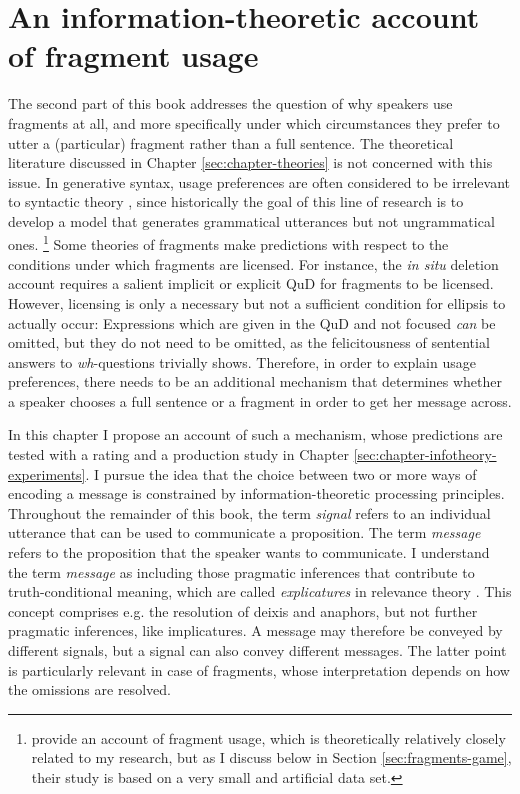 \chapter{An information-theoretic account of fragment usage}
\label{sec:chapter-infotheory}

The second part of this book addresses the question of why speakers use fragments at all, and more specifically under which circumstances they prefer to utter a (particular) fragment rather than a full sentence. The theoretical literature discussed in Chapter \ref{sec:chapter-theories} is not concerned with this issue. In generative syntax, usage preferences are often considered to be irrelevant to syntactic theory \citep[see e.g.][]{newmeyer2003}, since historically the goal of this line of research is to develop a model that generates grammatical utterances but not ungrammatical ones.%
%
\footnote{\citet{bergen.goodman2015} provide an account of fragment usage, which is theoretically relatively closely related to my research, but as I discuss below in Section \ref{sec:fragments-game}, their study is based on a very small and artificial data set.}\afterfn%
%
Some theories of fragments make predictions with respect to the conditions under which fragments are licensed. For instance, the \textit{in situ} deletion account \citep{reich2007} requires a salient implicit or explicit QuD for fragments to be licensed. However, licensing is only a necessary but not a sufficient condition for ellipsis to actually occur: Expressions which are given in the QuD and not focused \textit{can} be omitted, but they do not need to be omitted, as the felicitousness of sentential answers to \textit{wh}-questions trivially shows. Therefore, in order to explain usage preferences, there needs to be an additional mechanism that determines whether a speaker chooses a full sentence or a fragment in order to get her message across. 

In this chapter I propose an account of such a mechanism, whose predictions are tested with a rating and a production study in Chapter \ref{sec:chapter-infotheory-experiments}. I pursue the idea that the choice between two or more ways of encoding a message is constrained by information-theoretic \citep{shannon1948} processing principles. Throughout the remainder of this book, the term \textit{signal} refers to an individual utterance that can be used to communicate a proposition. The term \textit{message} refers to the proposition that the speaker wants to communicate. I understand the term \textit{message} as including those pragmatic inferences that contribute to truth-conditional meaning, which are called \textit{explicatures} in relevance theory \citep{sperber.wilson1995}. This concept comprises e.g. the resolution of deixis and anaphors, but not further pragmatic inferences, like implicatures. A message may therefore be conveyed by different signals, but a signal can also convey different messages. The latter point is particularly relevant in case of fragments, whose interpretation depends on how the omissions are resolved.


